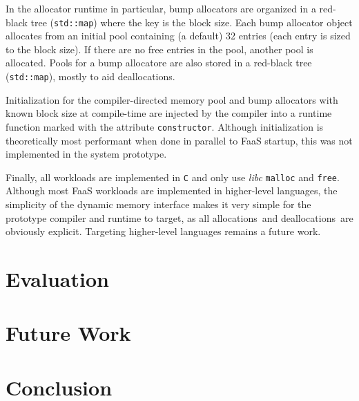 \documentclass{article}
\def\ALLS{allocations}
\def\DALLS{deallocations}
\begin{document}
In the allocator runtime in particular, bump allocators are organized in a red-black tree (\texttt{std::map})
where the key is the block size. Each bump allocator object allocates from an initial pool
containing (a default) 32 entries (each entry is sized to the block size). If there are no free entries
in the pool, another pool is allocated. Pools for a bump allocatore are also stored in a 
red-black tree (\texttt{std::map}), mostly to aid \DALLS .

Initialization for the compiler-directed memory pool and bump allocators with known block size at 
compile-time are injected by the compiler into a runtime function marked with the attribute 
\texttt{constructor}. Although initialization is theoretically most performant when done in parallel
to FaaS startup, this was not implemented in the system prototype.

Finally, all workloads are implemented in \texttt{C} and only use \textit{libc} \texttt{malloc} and 
\texttt{free}. Although most FaaS workloads are implemented in higher-level languages, the 
simplicity of the dynamic memory interface makes it very simple for the prototype compiler and 
runtime to target, as all \ALLS\ and \DALLS\ are obviously explicit. Targeting higher-level 
languages remains a future work.

\section{Evaluation}

\section{Future Work}

\section{Conclusion}



\end{document}
